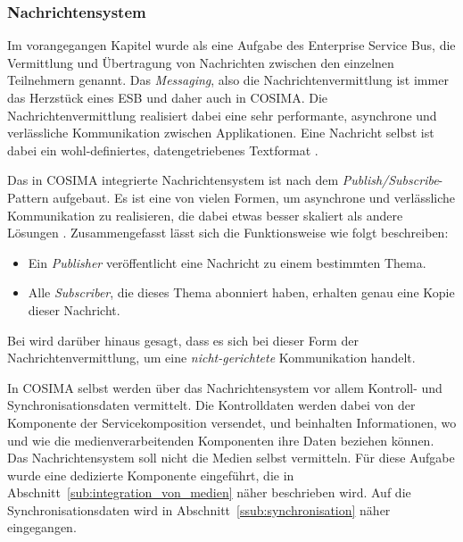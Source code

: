 \subsubsection{Nachrichtensystem} %
\label{ssub:nachrichtensystem}
  
  Im vorangegangen Kapitel wurde als eine Aufgabe des Enterprise Service Bus, die Vermittlung und Übertragung von Nachrichten zwischen den einzelnen Teilnehmern genannt. Das \emph{Messaging}, also die Nachrichtenvermittlung ist immer das Herzstück eines ESB \citep[S. 77]{enterprise_service_bus} und daher auch in COSIMA. Die Nachrichtenvermittlung realisiert dabei eine sehr performante, asynchrone und verlässliche Kommunikation zwischen Applikationen. Eine Nachricht selbst ist dabei ein wohl-definiertes, datengetriebenes Textformat \citep[S. 60f]{web_services_principles_and_technology}.
  
  Das in COSIMA integrierte Nachrichtensystem ist nach dem \emph{Publish/Subscribe}-Pattern \citep[S. 106]{enterprise_integration_patterns} aufgebaut. Es ist eine von vielen Formen, um asynchrone und verlässliche Kommunikation zu realisieren, die dabei etwas besser skaliert als andere Lösungen \citep[S. 69]{web_services_principles_and_technology}. Zusammengefasst lässt sich die Funktionsweise wie folgt beschreiben:
  
  \begin{itemize}
    \item Ein \emph{Publisher} veröffentlicht eine Nachricht zu einem bestimmten Thema.
    \item Alle \emph{Subscriber}, die dieses Thema abonniert haben, erhalten genau eine Kopie dieser Nachricht.
  \end{itemize}
  
  Bei \citep[S. 127]{soa_goes_real} wird darüber hinaus gesagt, dass es sich bei dieser Form der Nachrichtenvermittlung, um eine \emph{nicht-gerichtete} Kommunikation handelt.
  
  In COSIMA selbst werden über das Nachrichtensystem vor allem Kontroll- und Synchronisationsdaten vermittelt. Die Kontrolldaten werden dabei von der Komponente der Servicekomposition versendet, und beinhalten Informationen, wo und wie die medienverarbeitenden Komponenten ihre Daten beziehen können. Das Nachrichtensystem soll nicht die Medien selbst vermitteln. Für diese Aufgabe wurde eine dedizierte Komponente eingeführt, die in Abschnitt~\ref{sub:integration_von_medien} näher beschrieben wird. Auf die Synchronisationsdaten wird in Abschnitt~\ref{ssub:synchronisation} näher eingegangen.
  
